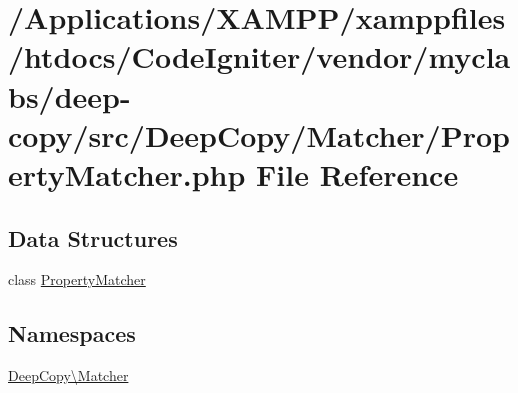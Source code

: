 \hypertarget{_property_matcher_8php}{}\section{/\+Applications/\+X\+A\+M\+P\+P/xamppfiles/htdocs/\+Code\+Igniter/vendor/myclabs/deep-\/copy/src/\+Deep\+Copy/\+Matcher/\+Property\+Matcher.php File Reference}
\label{_property_matcher_8php}
\subsection*{Data Structures}
\begin{DoxyCompactItemize}
\item 
class \mbox{\hyperlink{class_deep_copy_1_1_matcher_1_1_property_matcher}{Property\+Matcher}}
\end{DoxyCompactItemize}
\subsection*{Namespaces}
\begin{DoxyCompactItemize}
\item 
 \mbox{\hyperlink{namespace_deep_copy_1_1_matcher}{Deep\+Copy\textbackslash{}\+Matcher}}
\end{DoxyCompactItemize}
